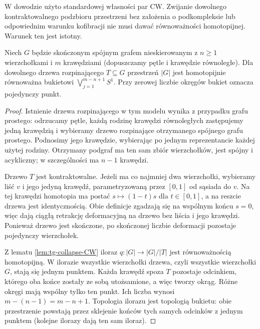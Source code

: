 \begin{uwaga}
W dowodzie użyto standardowej własności par CW.
Zwijanie dowolnego kontraktowalnego podzbioru przestrzeni
bez założenia o podkompleksie lub odpowiednim warunku
kofibracji nie musi dawać równoważności homotopijnej. Warunek ten jest istotny.
\end{uwaga}

\newpage
\begin{twierdzenie}
\label{thm:tg-wedge}
Niech $G$ będzie skończonym spójnym grafem nieskierowanym
z $n\ge1$ wierzchołkami i $m$ krawędziami
(dopuszczamy pętle i krawędzie równoległe).
Dla dowolnego drzewa rozpinającego $T\subseteq G$
przestrzeń $|G|$ jest homotopijnie równoważna bukietowi
$\bigvee_{j=1}^{m-n+1}S^1$.
Przy zerowej liczbie okręgów bukiet oznacza pojedynczy punkt.
\end{twierdzenie}

\begin{proof}
Istnienie drzewa rozpinającego w tym modelu
wynika z przypadku grafu prostego: odrzucamy pętle,
każdą rodzinę krawędzi równoległych zastępujemy
jedną krawędzią i wybieramy drzewo rozpinające
otrzymanego spójnego grafu prostego. Podnosimy jego
krawędzie, wybierając po jednym reprezentancie
każdej użytej rodziny. Otrzymany podgraf ma ten sam
zbiór wierzchołków, jest spójny i acykliczny;
w szczególności ma $n-1$ krawędzi.

Drzewo $T$ jest kontraktowalne. Jeżeli ma co najmniej
dwa wierzchołki, wybieramy liść $v$ i jego jedyną
krawędź, parametryzowaną przez $[0,1]$ od sąsiada do $v$.
Na tej krawędzi homotopia ma postać $s\mapsto(1-t)s$
dla $t\in[0,1]$, a na reszcie drzewa jest identycznością.
Obie definicje zgadzają się na wspólnym końcu $s=0$,
więc dają ciągłą retrakcję deformacyjną na drzewo
bez liścia i jego krawędzi. Ponieważ drzewo
jest skończone, po skończonej liczbie deformacji
pozostaje pojedynczy wierzchołek.

Z lematu \ref{lem:tg-collapse-CW} iloraz
$q:|G|\to|G|/|T|$ jest równoważnością homotopijną.
W ilorazie wszystkie wierzchołki drzewa, czyli wszystkie
wierzchołki $G$, stają się jednym punktem.
Każda krawędź spoza $T$ pozostaje odcinkiem, którego
oba końce zostały ze sobą utożsamione, a więc tworzy
okrąg. Różne okręgi mają wspólny tylko ten punkt.
Ich liczba wynosi $m-(n-1)=m-n+1$.
Topologia ilorazu jest topologią bukietu: obie przestrzenie
powstają przez sklejenie końców tych samych odcinków
z jednym punktem (kolejne ilorazy dają ten sam iloraz).
\end{proof}

